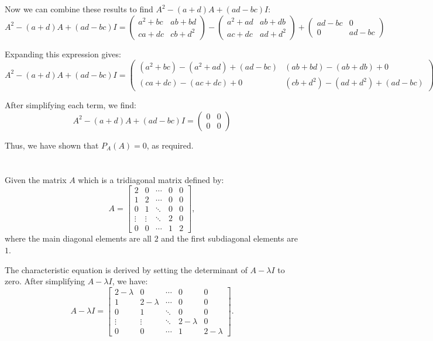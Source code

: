 \documentclass{article}
\begin{document}
Now we can combine these results to find \( A^2 - (a + d)A + (ad - bc)I \):
\[
    A^2 - (a + d)A + (ad - bc)I = \begin{pmatrix} a^2 + bc & ab + bd \\ ca + dc & cb + d^2 \end{pmatrix} - \begin{pmatrix} a^2 + ad & ab + db \\ ac + dc & ad + d^2 \end{pmatrix} + \begin{pmatrix} ad - bc & 0 \\ 0 & ad - bc \end{pmatrix}
\]

Expanding this expression gives:
\[
    A^2 - (a + d)A + (ad - bc)I = \begin{pmatrix} (a^2 + bc) - (a^2 + ad) + (ad - bc) & (ab + bd) - (ab + db) + 0 \\ (ca + dc) - (ac + dc) + 0 & (cb + d^2) - (ad + d^2) + (ad - bc) \end{pmatrix}
\]

After simplifying each term, we find:
\[
    A^2 - (a + d)A + (ad - bc)I = \begin{pmatrix} 0 & 0 \\ 0 & 0 \end{pmatrix}
\]

Thus, we have shown that \( P_A(A) = 0 \), as required.

\section{}

Given the matrix \(A\) which is a tridiagonal matrix defined by:
\[ A = \begin{bmatrix}
        2      & 0      & \cdots & 0 & 0 \\
        1      & 2      & \cdots & 0 & 0 \\
        0      & 1      & \ddots & 0 & 0 \\
        \vdots & \vdots & \ddots & 2 & 0 \\
        0      & 0      & \cdots & 1 & 2
    \end{bmatrix}, \]
where the main diagonal elements are all \(2\) and the first subdiagonal elements are \(1\).

The characteristic equation is derived by setting the determinant of \(A - \lambda I\) to zero. After simplifying \(A - \lambda I\), we have:
\[ A - \lambda I = \begin{bmatrix}
        2-\lambda & 0         & \cdots & 0         & 0         \\
        1         & 2-\lambda & \cdots & 0         & 0         \\
        0         & 1         & \ddots & 0         & 0         \\
        \vdots    & \vdots    & \ddots & 2-\lambda & 0         \\
        0         & 0         & \cdots & 1         & 2-\lambda
    \end{bmatrix}. \]
\end{document}

